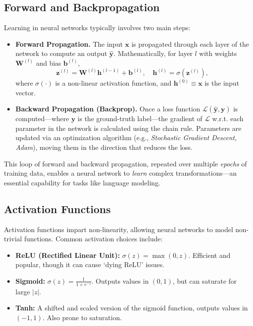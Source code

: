 \subsection{Forward and Backpropagation}
\noindent
Learning in neural networks typically involves two main steps:
\begin{itemize}
    \item \textbf{Forward Propagation.} The input $\mathbf{x}$ is propagated through each layer of the network to compute an output $\hat{\mathbf{y}}$. Mathematically, for layer $l$ with weights $\mathbf{W}^{(l)}$ and bias $\mathbf{b}^{(l)}$,
    \[
        \mathbf{z}^{(l)} = \mathbf{W}^{(l)} \mathbf{h}^{(l-1)} + \mathbf{b}^{(l)}, \quad \mathbf{h}^{(l)} = \sigma(\mathbf{z}^{(l)}),
    \]
    where $\sigma(\cdot)$ is a non-linear activation function, and $\mathbf{h}^{(0)} \equiv \mathbf{x}$ is the input vector.

    \item \textbf{Backward Propagation (Backprop).} Once a loss function $\mathcal{L}(\hat{\mathbf{y}}, \mathbf{y})$ is computed—where $\mathbf{y}$ is the ground-truth label—the gradient of $\mathcal{L}$ w.r.t. each parameter in the network is calculated using the chain rule. Parameters are updated via an optimization algorithm (e.g., \textit{Stochastic Gradient Descent}, \textit{Adam}), moving them in the direction that reduces the loss.
\end{itemize}

\noindent
This loop of forward and backward propagation, repeated over multiple \emph{epochs} of training data, enables a neural network to \emph{learn} complex transformations—an essential capability for tasks like language modeling.

\subsection{Activation Functions}
\noindent
Activation functions impart non-linearity, allowing neural networks to model non-trivial functions. Common activation choices include:
\begin{itemize}
    \item \textbf{ReLU (Rectified Linear Unit):} $\sigma(z) = \max(0, z)$. Efficient and popular, though it can cause `dying ReLU’ issues.
    \item \textbf{Sigmoid:} $\sigma(z) = \frac{1}{1+e^{-z}}$. Outputs values in $(0,1)$, but can saturate for large $|z|$.
    \item \textbf{Tanh:} A shifted and scaled version of the sigmoid function, outputs values in $(-1, 1)$. Also prone to saturation.
\end{itemize}

